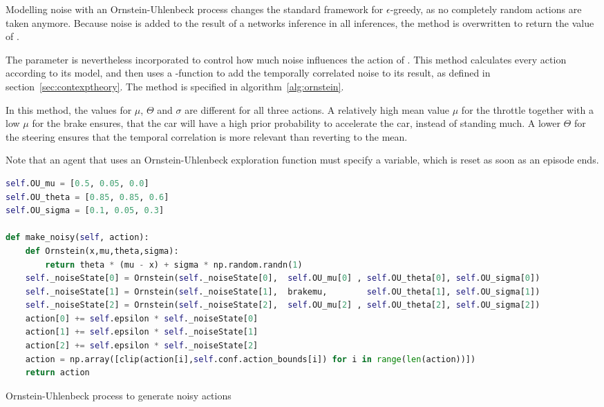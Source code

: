 Modelling noise with an Ornstein-Uhlenbeck process changes the standard framework for $\epsilon$-greedy, as no completely random actions are taken anymore. Because noise is added to the result of a networks inference in all inferences, the method  is overwritten to return the value of . 

The parameter  is nevertheless incorporated to control how much noise influences the action of . This method calculates every action according to its model, and then uses a -function to add the temporally correlated noise to its result, as defined in section~\ref{sec:contexptheory}. The method  is specified in algorithm~\ref{alg:ornstein}. 

In this method, the values for $\mu$, $\Theta$ and $\sigma$ are different for all three actions. A relatively high mean value $\mu$ for the throttle together with a low $\mu$ for the brake ensures, that the car will have a high prior probability to accelerate the car, instead of standing much. A lower $\Theta$ for the steering ensures that the temporal correlation is more relevant than reverting to the mean.

Note that an agent that uses an Ornstein-Uhlenbeck exploration function must specify a  variable, which is reset as soon as an episode ends.

\begin{algorithm}[h]
	\begin{lstlisting}[language=Python, style=Python, frame=none]
self.OU_mu = [0.5, 0.05, 0.0]
self.OU_theta = [0.85, 0.85, 0.6]
self.OU_sigma = [0.1, 0.05, 0.3]

def make_noisy(self, action):
	def Ornstein(x,mu,theta,sigma):
		return theta * (mu - x) + sigma * np.random.randn(1)
	self._noiseState[0] = Ornstein(self._noiseState[0],  self.OU_mu[0] , self.OU_theta[0], self.OU_sigma[0])
	self._noiseState[1] = Ornstein(self._noiseState[1],  brakemu,        self.OU_theta[1], self.OU_sigma[1])  
	self._noiseState[2] = Ornstein(self._noiseState[2],  self.OU_mu[2] , self.OU_theta[2], self.OU_sigma[2])
	action[0] += self.epsilon * self._noiseState[0]
	action[1] += self.epsilon * self._noiseState[1]
	action[2] += self.epsilon * self._noiseState[2]
	action = np.array([clip(action[i],self.conf.action_bounds[i]) for i in range(len(action))])
	return action
	\end{lstlisting}%
	\caption{Ornstein-Uhlenbeck process to generate noisy actions}
	\label{alg:ornstein}
\end{algorithm}



